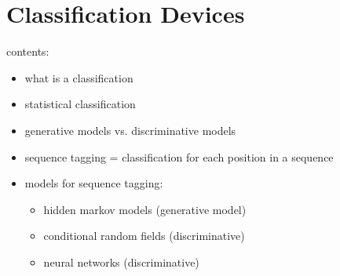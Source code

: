 \documentclass[../document.tex]{subfiles}
\begin{document}
    \section{Classification Devices}
    contents:
    \begin{itemize}
        \item what is a classification
        \item statistical classification
        \item generative models vs. discriminative models
        \item sequence tagging = classification for each position in a sequence

        \item models for sequence tagging:
        \begin{itemize}
            \item hidden markov models (generative model)
            \item conditional random fields (discriminative)
            \item neural networks (discriminative)
        \end{itemize}
    \end{itemize}


    \ifSubfilesClassLoaded{%
        \printglossaries
    }{}
\end{document}
